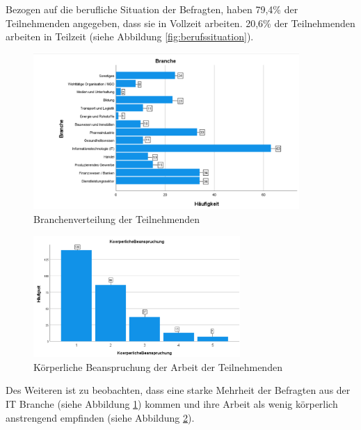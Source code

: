 Bezogen auf die berufliche Situation der Befragten, haben 79,4\% der Teilnehmenden angegeben, dass sie in 
Vollzeit arbeiten. 20,6\% der Teilnehmenden arbeiten in Teilzeit (siehe Abbildung \ref{fig:berufssituation}).

\begin{figure}[h]
    \centering
    \includegraphics[width=0.9\textwidth]{04_Artefakte/01_Abbildungen/deskriptiv_branche.png}
    \caption{Branchenverteilung der Teilnehmenden}
    \label{fig:branche} 
\end{figure}

\begin{figure}[h]
    \centering
    \includegraphics[width=0.7\textwidth]{04_Artefakte/01_Abbildungen/deskriptiv_koerperliche_beanspruchung.png}
    \caption{Körperliche Beanspruchung der Arbeit der Teilnehmenden}
    \label{fig:koerperliche_beanspruchung}
\end{figure}
Des Weiteren ist zu beobachten, dass eine starke Mehrheit der Befragten aus der IT Branche 
(siehe Abbildung \ref{fig:branche}) kommen und ihre Arbeit als wenig körperlich anstrengend empfinden 
(siehe Abbildung \ref{fig:koerperliche_beanspruchung}).

